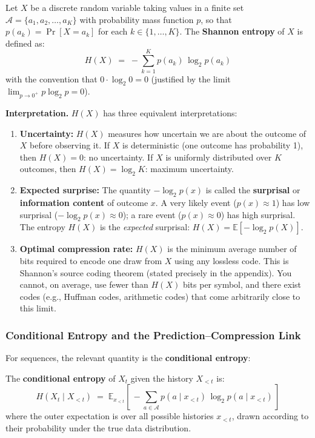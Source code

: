 \documentclass[11pt, a4paper]{article}
\begin{document}
\begin{definition}[title={Shannon Entropy}]
Let $X$ be a discrete random variable taking values in a finite set
$\mathcal{A} = \{a_1, a_2, \ldots, a_K\}$ with probability mass function
$p$, so that $p(a_k) = \Pr[X = a_k]$ for each $k \in \{1, \ldots, K\}$.
The \textbf{Shannon entropy} of $X$ is defined as:
\[
H(X) \;=\; -\sum_{k=1}^{K} p(a_k) \,\log_2 p(a_k)
\]
with the convention that $0 \cdot \log_2 0 = 0$ (justified by the
limit $\lim_{p \to 0^+} p \log_2 p = 0$).
\end{definition}

\textbf{Interpretation.} $H(X)$ has three equivalent interpretations:
\begin{enumerate}[leftmargin=2em]
  \item \textbf{Uncertainty:} $H(X)$ measures how uncertain we are about
    the outcome of $X$ before observing it. If $X$ is deterministic
    (one outcome has probability 1), then $H(X) = 0$: no uncertainty.
    If $X$ is uniformly distributed over $K$ outcomes, then
    $H(X) = \log_2 K$: maximum uncertainty.

  \item \textbf{Expected surprise:} The quantity $-\log_2 p(x)$ is called
    the \textbf{surprisal} or \textbf{information content} of outcome $x$.
    A very likely event ($p(x) \approx 1$) has low surprisal
    ($-\log_2 p(x) \approx 0$); a rare event ($p(x) \approx 0$) has high
    surprisal. The entropy $H(X)$ is the \emph{expected} surprisal:
    $H(X) = \mathbb{E}[-\log_2 p(X)]$.

  \item \textbf{Optimal compression rate:} $H(X)$ is the minimum average
    number of bits required to encode one draw from $X$ using any lossless
    code. This is Shannon's source coding theorem (stated precisely in the
    appendix). You cannot, on average, use fewer than $H(X)$ bits per
    symbol, and there exist codes (e.g., Huffman codes, arithmetic codes)
    that come arbitrarily close to this limit.
\end{enumerate}

\subsubsection{Conditional Entropy and the Prediction--Compression Link}

For sequences, the relevant quantity is the \textbf{conditional entropy}:

\begin{definition}[title={Conditional Entropy}]
The \textbf{conditional entropy} of $X_t$ given the history $X_{<t}$ is:
\[
H(X_t \mid X_{<t}) \;=\; \mathbb{E}_{x_{<t}}\!\left[\,
  -\sum_{a \in \mathcal{A}} p(a \mid x_{<t}) \,\log_2 p(a \mid x_{<t})
\,\right]
\]
where the outer expectation is over all possible histories $x_{<t}$,
drawn according to their probability under the true data distribution.
\end{definition}
\end{document}
